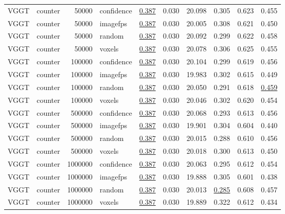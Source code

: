 \begin{table}[H]
\begin{tabular}{llrlrrrrrr}
VGGT & counter & 50000 & confidence & \underline{0.387} & 0.030 & 20.098 & 0.305 & 0.623 & 0.455 \\
VGGT & counter & 50000 & imagefps & \underline{0.387} & 0.030 & 20.005 & 0.308 & 0.621 & 0.450 \\
VGGT & counter & 50000 & random & \underline{0.387} & 0.030 & 20.092 & 0.299 & 0.622 & 0.458 \\
VGGT & counter & 50000 & voxels & \underline{0.387} & 0.030 & 20.078 & 0.306 & 0.625 & 0.455 \\
VGGT & counter & 100000 & confidence & \underline{0.387} & 0.030 & 20.104 & 0.299 & 0.619 & 0.456 \\
VGGT & counter & 100000 & imagefps & \underline{0.387} & 0.030 & 19.983 & 0.302 & 0.615 & 0.449 \\
VGGT & counter & 100000 & random & \underline{0.387} & 0.030 & 20.050 & 0.291 & 0.618 & \underline{0.459} \\
VGGT & counter & 100000 & voxels & \underline{0.387} & 0.030 & 20.046 & 0.302 & 0.620 & 0.454 \\
VGGT & counter & 500000 & confidence & \underline{0.387} & 0.030 & 20.068 & 0.293 & 0.613 & 0.456 \\
VGGT & counter & 500000 & imagefps & \underline{0.387} & 0.030 & 19.901 & 0.304 & 0.604 & 0.440 \\
VGGT & counter & 500000 & random & \underline{0.387} & 0.030 & 20.015 & 0.288 & 0.610 & 0.456 \\
VGGT & counter & 500000 & voxels & \underline{0.387} & 0.030 & 20.018 & 0.300 & 0.613 & 0.450 \\
VGGT & counter & 1000000 & confidence & \underline{0.387} & 0.030 & 20.063 & 0.295 & 0.612 & 0.454 \\
VGGT & counter & 1000000 & imagefps & \underline{0.387} & 0.030 & 19.888 & 0.305 & 0.601 & 0.438 \\
VGGT & counter & 1000000 & random & \underline{0.387} & 0.030 & 20.013 & \underline{0.285} & 0.608 & 0.457 \\
VGGT & counter & 1000000 & voxels & \underline{0.387} & 0.030 & 19.889 & 0.322 & 0.612 & 0.434 \\
\bottomrule
\end{tabular}
\end{table}